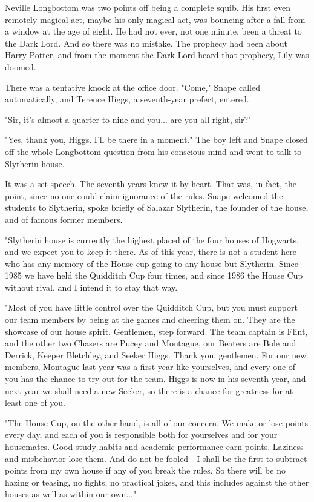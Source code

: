 Neville Longbottom was two points off being a complete squib. His first even remotely magical act, maybe his only magical act, was bouncing after a fall from a window at the age of eight. He had not ever, not one minute, been a threat to the Dark Lord. And so there was no mistake. The prophecy had been about Harry Potter, and from the moment the Dark Lord heard that prophecy, Lily was doomed.

There was a tentative knock at the office door. "Come," Snape called automatically, and Terence Higgs, a seventh-year prefect, entered.

"Sir, it's almost a quarter to nine and you... are you all right, sir?"

"Yes, thank you, Higgs. I'll be there in a moment." The boy left and Snape closed off the whole Longbottom question from his conscious mind and went to talk to Slytherin house.

It was a set speech. The seventh years knew it by heart. That was, in fact, the point, since no one could claim ignorance of the rules. Snape welcomed the students to Slytherin, spoke briefly of Salazar Slytherin, the founder of the house, and of famous former members.

"Slytherin house is currently the highest placed of the four houses of Hogwarts, and we expect you to keep it there. As of this year, there is not a student here who has any memory of the House cup going to any house but Slytherin. Since 1985 we have held the Quidditch Cup four times, and since 1986 the House Cup without rival, and I intend it to stay that way.

"Most of you have little control over the Quidditch Cup, but you must support our team members by being at the games and cheering them on. They are the showcase of our house spirit. Gentlemen, step forward. The team captain is Flint, and the other two Chasers are Pucey and Montague, our Beaters are Bole and Derrick, Keeper Bletchley, and Seeker Higgs. Thank you, gentlemen. For our new members, Montague last year was a first year like yourselves, and every one of you has the chance to try out for the team. Higgs is now in his seventh year, and next year we shall need a new Seeker, so there is a chance for greatness for at least one of you.

"The House Cup, on the other hand, is all of our concern. We make or lose points every day, and each of you is responsible both for yourselves and for your housemates. Good study habits and academic performance earn points. Laziness and misbehavior lose them. And do not be fooled - I shall be the first to subtract points from my own house if any of you break the rules. So there will be no hazing or teasing, no fights, no practical jokes, and this includes against the other houses as well as within our own..."

